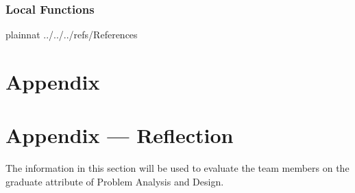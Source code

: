 \documentclass[12pt, titlepage]{article}
\begin{document}
  
  
  
  \subsubsection{Local Functions}

  
   
  

\newpage


 {plainnat}
 {../../../refs/References}

\newpage

\section{Appendix} \label{Appendix}


\newpage{}

\section*{Appendix --- Reflection}


The information in this section will be used to evaluate the team members on the
graduate attribute of Problem Analysis and Design.


\end{document}
